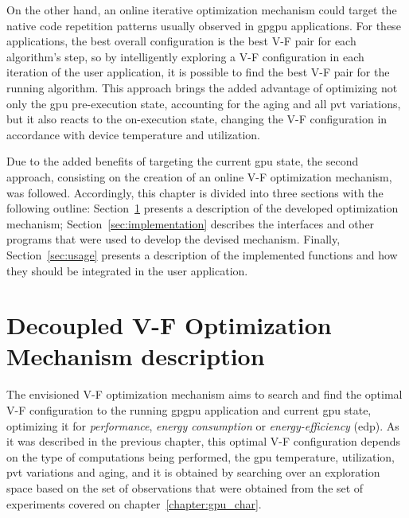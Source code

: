 On the other hand, an online iterative optimization mechanism could target the native code repetition patterns usually observed in \acrshort{gpgpu} applications. For these applications, the best overall configuration is the best V-F pair for each algorithm's step, so by intelligently exploring a V-F configuration in each iteration of the user application, it is possible to find the best V-F pair for the running algorithm.
This approach brings the added advantage of optimizing not only the \acrshort{gpu} pre-execution state, accounting for the aging and all \acrshort{pvt} variations, but it also reacts to the on-execution state, changing the V-F configuration in accordance with device temperature and utilization.



Due to the added benefits of targeting the current \acrshort{gpu} state, the second approach, consisting on the creation of an online V-F optimization mechanism, was followed. 
Accordingly, this chapter is divided into three sections with the following outline: Section~\ref{section:opt} presents a description of the developed optimization mechanism; Section~\ref{sec:implementation} describes the interfaces and other programs that were used to develop the devised mechanism. Finally, Section~\ref{sec:usage} presents a description of the implemented functions and how they should be integrated in the user application.



\section{Decoupled V-F Optimization Mechanism description}
\label{section:opt}


The envisioned V-F optimization mechanism aims to search and find the optimal V-F configuration to the running \acrshort{gpgpu} application and current \acrshort{gpu} state, optimizing it for \textit{performance}, \textit{energy consumption} or \textit{energy-efficiency} (\acrshort{edp}). As it was described in the previous chapter, this optimal V-F configuration depends on the type of computations being performed, the \acrshort{gpu} temperature, utilization, \acrshort{pvt} variations and aging, and it is obtained by searching over an exploration space based on the set of observations that were obtained from the set of experiments covered on chapter~\ref{chapter:gpu_char}. 

